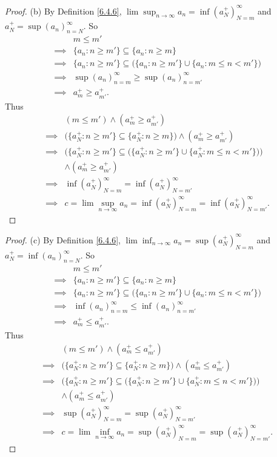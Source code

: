 \begin{proof}{(b)}
By Definition \ref{6.4.6}, \(\lim\sup_{n \to \infty} a_n = \inf(a_N^+)_{N = m}^\infty\) and \(a_N^+ = \sup(a_n)_{n = N}^\infty\).
So
\begin{align*}
& m \leq m' \\
\implies & \{a_n : n \geq m'\} \subseteq \{a_n : n \geq m\} \\
\implies & \{a_n : n \geq m'\} \subseteq \big(\{a_n : n \geq m'\} \cup \{a_n : m \leq n < m'\}\big) \\
\implies & \sup(a_n)_{n = m}^\infty \geq \sup(a_n)_{n = m'}^\infty \\
\implies & a_m^+ \geq a_{m'}^+.
\end{align*}
Thus
\begin{align*}
& (m \leq m') \land (a_m^+ \geq a_{m'}^+) \\
\implies & \big(\{a_N^+ : n \geq m'\} \subseteq \{a_N^+ : n \geq m\}\big) \land (a_m^+ \geq a_{m'}^+)\\
\implies & \bigg(\{a_N^+ : n \geq m'\} \subseteq \big(\{a_N^+ : n \geq m'\} \cup \{a_N^+ : m \leq n < m'\}\big)\bigg) \\
& \land (a_m^+ \geq a_{m'}^+) \\
\implies & \inf(a_N^+)_{N = m}^\infty = \inf(a_N^+)_{N = m'}^\infty \\
\implies & c = \lim\sup_{n \to \infty} a_n = \inf(a_N^+)_{N = m}^\infty = \inf(a_N^+)_{N = m'}^\infty.
\end{align*}
\end{proof}

\begin{proof}{(c)}
By Definition \ref{6.4.6}, \(\lim\inf_{n \to \infty} a_n = \sup(a_N^+)_{N = m}^\infty\) and \(a_N^+ = \inf(a_n)_{n = N}^\infty\).
So
\begin{align*}
& m \leq m' \\
\implies & \{a_n : n \geq m'\} \subseteq \{a_n : n \geq m\} \\
\implies & \{a_n : n \geq m'\} \subseteq \big(\{a_n : n \geq m'\} \cup \{a_n : m \leq n < m'\}\big) \\
\implies & \inf(a_n)_{n = m}^\infty \leq \inf(a_n)_{n = m'}^\infty \\
\implies & a_m^+ \leq a_{m'}^+.
\end{align*}
Thus
\begin{align*}
& (m \leq m') \land (a_m^+ \leq a_{m'}^+) \\
\implies & \big(\{a_N^+ : n \geq m'\} \subseteq \{a_N^+ : n \geq m\}\big) \land (a_m^+ \leq a_{m'}^+)\\
\implies & \bigg(\{a_N^+ : n \geq m'\} \subseteq \big(\{a_N^+ : n \geq m'\} \cup \{a_N^+ : m \leq n < m'\}\big)\bigg) \\
& \land (a_m^+ \leq a_{m'}^+) \\
\implies & \sup(a_N^+)_{N = m}^\infty = \sup(a_N^+)_{N = m'}^\infty \\
\implies & c = \lim\inf_{n \to \infty} a_n = \sup(a_N^+)_{N = m}^\infty = \sup(a_N^+)_{N = m'}^\infty.
\end{align*}
\end{proof}

